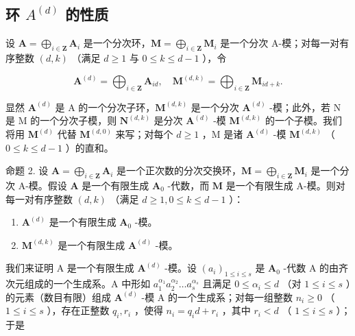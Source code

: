 \subsection{\texorpdfstring{环 \(A^{(d)}\) 的性质}{环 A(d) 的性质}}

设 \(\mathbf{A} = \bigoplus_{i\in \mathbf{Z}}\mathbf{A}_i\) 是一个分次环，\(\mathbf{M} = \bigoplus_{i\in \mathbf{Z}}\mathbf{M}_i\) 是一个分次 A-模；对每一对有序整数 \((d, k)\) （满足 \(d \geqslant 1\) 与 \(0 \leqslant k \leqslant d - 1\) ），令

\[
\mathbf {A} ^ {(d)} = \bigoplus_ {i \in \mathbf {Z}} \mathbf {A} _ {i d}, \quad \mathbf {M} ^ {(d, k)} = \bigoplus_ {i \in \mathbf {Z}} \mathbf {M} _ {i d + k}.
\]

显然 \(\mathbf{A}^{(d)}\) 是 A 的一个分次子环，\(\mathbf{M}^{(d,k)}\) 是一个分次 \(\mathbf{A}^{(d)}\) -模；此外，若 N 是 M 的一个分次子模，则 \(\mathbf{N}^{(d,k)}\) 是分次 \(\mathbf{A}^{(d)}\) -模 \(\mathbf{M}^{(d,k)}\) 的一个子模。我们将用 \(\mathbf{M}^{(d)}\) 代替 \(\mathbf{M}^{(d,0)}\) 来写；对每个 \(d \geqslant 1\) ，M 是诸 \(\mathbf{A}^{(d)}\) -模 \(\mathbf{M}^{(d,k)}\) （ \(0 \leqslant k \leqslant d - 1\) ）的直和。

命题 2. 设 \(\mathbf{A} = \bigoplus_{i\in \mathbf{Z}}\mathbf{A}_i\) 是一个正次数的分次交换环，\(\mathbf{M} = \bigoplus_{i\in \mathbf{Z}}\mathbf{M}_i\) 是一个分次 A-模。假设 \(\mathbf{A}\) 是一个有限生成 \(\mathbf{A}_0\) -代数，而 \(\mathbf{M}\) 是一个有限生成 A-模。则对每一对有序整数 \((d,k)\) （满足 \(d\geqslant 1,0\leqslant k\leqslant d - 1\) ）：

\begin{enumerate}
\def\labelenumi{(\roman{enumi})}
\item
  \(\mathbf{A}^{(d)}\) 是一个有限生成 \(\mathbf{A}_0\) -模。
\item
  \(\mathbf{M}^{(d,k)}\) 是一个有限生成 \(\mathbf{A}^{(d)}\) -模。
\end{enumerate}

我们来证明 A 是一个有限生成 \(\mathbf{A}^{(d)}\) -模。设 \((a_{i})_{1\leqslant i\leqslant s}\) 是 \(\mathbf{A}_0\) -代数 A 的由齐次元组成的一个生成系。A 中形如 \(a_1^{\alpha_1}a_2^{\alpha_2}\ldots a_s^{\alpha_s}\) 且满足 \(0\leqslant \alpha_{i}\leqslant d\) （对 \(1\leqslant i\leqslant s\) ）的元素（数目有限）组成 \(\mathbf{A}^{(d)}\) -模 A 的一个生成系；对每一组整数 \(n_i\geqslant 0\) （ \(1\leqslant i\leqslant s\) ），存在正整数 \(q_{i}, r_{i}\) ，使得 \(n_i = q_id + r_i\) ，其中 \(r_i < d\) （ \(1\leqslant i\leqslant s\) ）；于是

